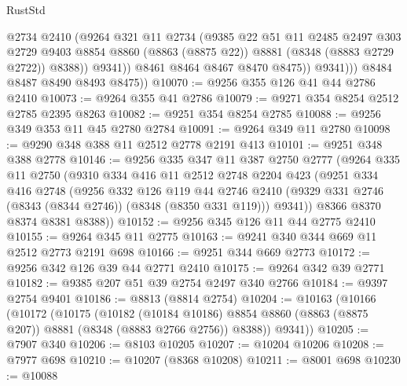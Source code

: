 \begin{lexlean}{RustStd}
\begin{coremodule}
                      @2734
                      @2410
                      (@9264
                        @321
                        @11
                        @2734
                        (@9385
                          @22
                          @51
                          @11
                          @2485
                          @2497
                          @303
                          @2729
                          @9403
                          @8854
                          @8860
                          (@8863 (@8875 @22))
                          @8881
                          (@8348 (@8883 @2729 @2722))
                          @8388))
                      @9341))
                  @8461
                  @8464
                  @8467
                  @8470
                  @8475))
              @9341)))
        @8484
        @8487
        @8490
        @8493
        @8475))
@10070 := @9256 @355 @126 @41 @44 @2786 @2410
@10073 := @9264 @355 @41 @2786
@10079 := @9271 @354 @8254 @2512 @2785 @2395 @8263
@10082 := @9251 @354 @8254 @2785
@10088 := @9256 @349 @353 @11 @45 @2780 @2784
@10091 := @9264 @349 @11 @2780
@10098 := @9290 @348 @388 @11 @2512 @2778 @2191 @413
@10101 := @9251 @348 @388 @2778
@10146 := @9256
    @335
    @347
    @11
    @387
    @2750
    @2777
    (@9264
      @335
      @11
      @2750
      (@9310
        @334
        @416
        @11
        @2512
        @2748
        @2204
        @423
        (@9251
          @334
          @416
          @2748
          (@9256
            @332
            @126
            @119
            @44
            @2746
            @2410
            (@9329 @331 @2746 (@8343 (@8344 @2746)) (@8348 (@8350 @331 @119)))
            @9341))
        @8366
        @8370
        @8374
        @8381
        @8388))
@10152 := @9256 @345 @126 @11 @44 @2775 @2410
@10155 := @9264 @345 @11 @2775
@10163 := @9241 @340 @344 @669 @11 @2512 @2773 @2191 @698
@10166 := @9251 @344 @669 @2773
@10172 := @9256 @342 @126 @39 @44 @2771 @2410
@10175 := @9264 @342 @39 @2771
@10182 := @9385 @207 @51 @39 @2754 @2497 @340 @2766
@10184 := @9397 @2754 @9401
@10186 := @8813 (@8814 @2754)
@10204 := @10163
    (@10166
      (@10172
        (@10175
          (@10182
            (@10184 @10186)
            @8854
            @8860
            (@8863 (@8875 @207))
            @8881
            (@8348 (@8883 @2766 @2756))
            @8388))
        @9341))
@10205 := @7907 @340
@10206 := @8103 @10205
@10207 := @10204 @10206
@10208 := @7977 @698
@10210 := @10207 (@8368 @10208)
@10211 := @8001 @698
@10230 := @10088

\end{coremodule}
\end{lexlean}
